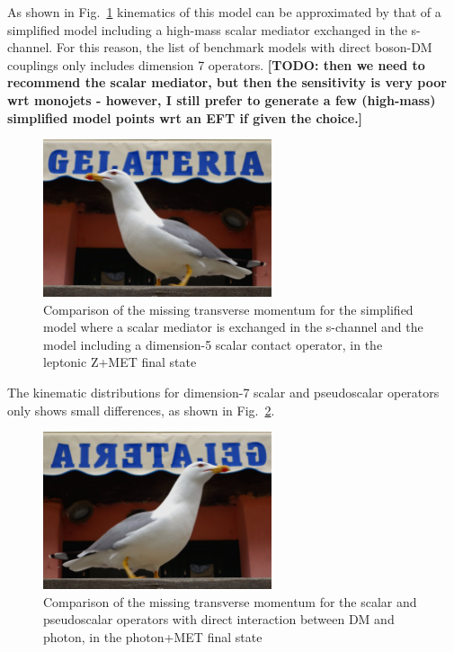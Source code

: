 
As shown in Fig.~\ref{fig:EW_EFT5_Zlep_MET}
kinematics of this model can be approximated by that of a simplified model including
a high-mass scalar mediator exchanged in the s-channel. For this reason,
the list of benchmark models with direct boson-DM couplings only includes dimension 7 operators.
\textbf{[TODO: then we need to recommend the scalar mediator,
but then the sensitivity is very poor wrt monojets - however, I still prefer
to generate a few (high-mass) simplified model points wrt an EFT if given the choice.]}

\begin{figure}
    \includegraphics[width=0.6\textwidth]{figures/gull}
    \caption{Comparison of the missing transverse momentum for the simplified model
    where a scalar mediator is exchanged in the s-channel and the model including
    a dimension-5 scalar contact operator, in the leptonic Z+MET final state}
    \label{fig:EW_EFT5_Zlep_MET}
\end{figure}

The kinematic distributions for dimension-7 scalar and pseudoscalar operators
only shows small differences, as shown in Fig.~\ref{fig:EW_EFT5_gamma_MET}.

\begin{figure}
    \includegraphics[width=0.6\textwidth]{figures/llug}
    \caption{Comparison of the missing transverse momentum for the scalar and pseudoscalar
    operators with direct interaction between DM and photon, in the photon+MET final state}
    \label{fig:EW_EFT5_gamma_MET}
\end{figure}

